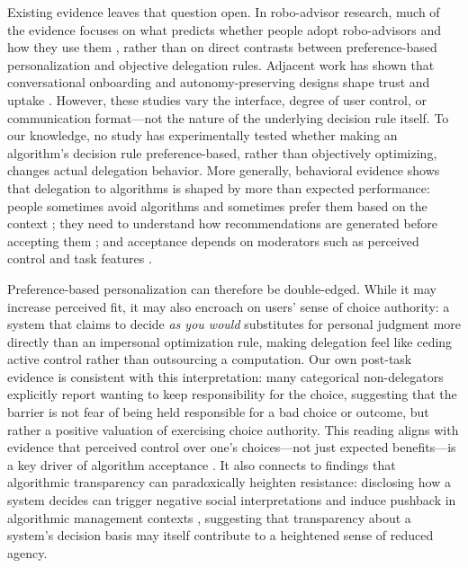 \documentclass[a4paper, 12pt, fleqn]{article}
\theoremstyle{definition}
\begin{document}
Existing evidence leaves that question open. In robo-advisor research, much of the evidence focuses on what predicts whether people adopt robo-advisors and how they use them \citep[for example,][]{Mahmud2025}, rather than on direct contrasts between preference-based personalization and objective delegation rules. Adjacent work has shown that conversational onboarding and autonomy-preserving designs shape trust and uptake \citep{Hildebrand2021,Fink2024}. However, these studies vary the interface, degree of user control, or communication format---not the nature of the underlying decision rule itself. To our knowledge, no study has experimentally tested whether making an algorithm's decision rule preference-based, rather than objectively optimizing, changes actual delegation behavior. More generally, behavioral evidence shows that delegation to algorithms is shaped by more than expected performance: people sometimes avoid algorithms and sometimes prefer them based on the context \citep{Dietvorst2018,Logg2019}; they need to understand how recommendations are generated before accepting them \citep{Yeomans2019}; and acceptance depends on moderators such as perceived control and task features \citep{Mahmud2022,Chugunova2022}.

Preference-based personalization can therefore be double-edged. While it may increase perceived fit, it may also encroach on users' sense of choice authority: a system that claims to decide \emph{as you would} substitutes for personal judgment more directly than an impersonal optimization rule, making delegation feel like ceding active control rather than outsourcing a computation. Our own post-task evidence is consistent with this interpretation: many categorical non-delegators explicitly report wanting to keep responsibility for the choice, suggesting that the barrier is not fear of being held responsible for a bad choice or outcome, but rather a positive valuation of exercising choice authority. This reading aligns with evidence that perceived control over one's choices---not just expected benefits---is a key driver of algorithm acceptance \citep{Schaap2024}. It also connects to findings that algorithmic transparency can paradoxically heighten resistance: disclosing how a system decides can trigger negative social interpretations \citep{Chen2024} and induce pushback in algorithmic management contexts \citep{Hu2024}, suggesting that transparency about a system's decision basis may itself contribute to a heightened sense of reduced agency.
\end{document}
